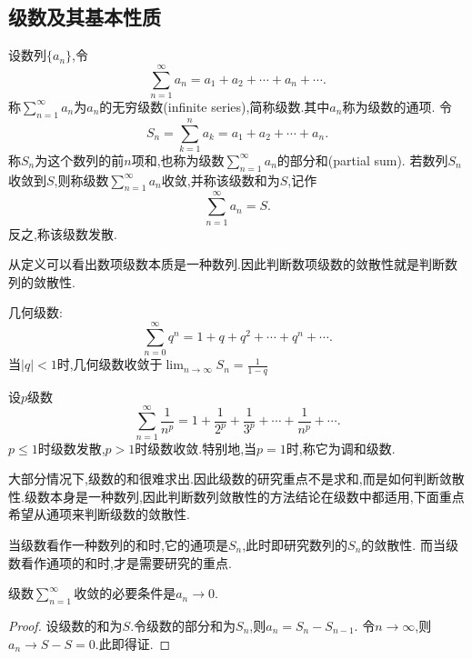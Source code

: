 \subsection{级数及其基本性质}

\begin{definition}[无穷级数]
    设数列$\{a_n\}$,令
    \[\sum_{n=1}^\infty a_n=a_1+a_2+\cdots+a_n+\cdots.\]
    称$\sum_{n=1}^\infty a_n$为$a_n$的无穷级数(infinite series),简称级数.其中$a_n$称为级数的通项.
    令\[S_n=\sum_{k=1}^n a_k=a_1+a_2+\cdots+a_n.\]
    称$S_n$为这个数列的前$n$项和,也称为级数$\sum_{n=1}^\infty a_n$的部分和(partial sum).
    若数列${S_n}$收敛到$S$,则称级数$\sum_{n=1}^\infty a_n$收敛,并称该级数和为$S$,记作\[\sum_{n=1}^\infty a_n=S.\]
    反之,称该级数发散.
\end{definition}

\begin{remark}
    从定义可以看出数项级数本质是一种数列.因此判断数项级数的敛散性就是判断数列的敛散性.
\end{remark}

\begin{example}[几何级数]
    几何级数:
    \[\sum_{n=0}^\infty q^n=1+q+q^2+\cdots+q^n+\cdots.\]
    当$|q|<1$时,几何级数收敛于$\lim_{n\to\infty}S_n=\frac{1}{1-q}$
\end{example}

\begin{example}[$p$级数]
    设$p$级数
    \[\sum_{n=1}^\infty\frac{1}{n^p}=1+\frac{1}{2^p}+\frac{1}{3^p}+\cdots+\frac{1}{n^p}+\cdots.\]
    $p\leqslant 1$时级数发散,$p>1$时级数收敛.特别地,当$p=1$时,称它为调和级数.
\end{example}

大部分情况下,级数的和很难求出.因此级数的研究重点不是求和,而是如何判断敛散性.级数本身是一种数列,因此判断数列敛散性的方法结论在级数中都适用,下面重点希望从通项来判断级数的敛散性.

\begin{note}
    当级数看作一种数列的和时,它的通项是$S_n$,此时即研究数列的$S_n$的敛散性.
    而当级数看作通项的和时,才是需要研究的重点.
\end{note}

\begin{proposition}[级数收敛的必要条件]
    级数$\sum_{n=1}^{\infty}$收敛的必要条件是$a_n\to 0.$    
\end{proposition}

\begin{proof}
    设级数的和为$S$.令级数的部分和为$S_n$,则$a_n=S_n-S_{n-1}$.
    令$n\to\infty$,则$a_n\to S-S=0.$此即得证.
\end{proof}

